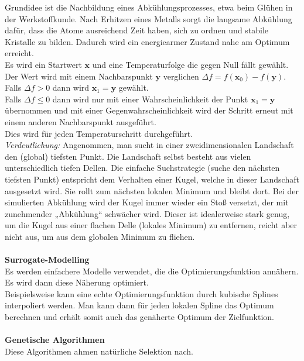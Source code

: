 			Grundidee ist die Nachbildung eines Abkühlungsprozesses, etwa beim Glühen in der Werkstoffkunde. Nach Erhitzen eines Metalls sorgt die langsame Abkühlung dafür, dass die Atome ausreichend Zeit haben, sich zu ordnen und stabile Kristalle zu bilden. Dadurch wird ein energiearmer Zustand nahe am Optimum erreicht. \\
			Es wird ein Startwert $ \bm{x} $ und eine Temperaturfolge die gegen Null fällt gewählt. Der Wert wird mit einem Nachbarspunkt $ \bm{y} $ verglichen $ \Delta f = f(\bm{x}_{0})-f(\bm{y}) $.\\
			Falls $ \Delta f > 0 $ dann wird $ \bm{x}_{1}=\bm{y} $ gewählt.\\
			Falls $ \Delta f \leq 0 $ dann wird nur mit einer Wahrscheinlichkeit der Punkt $ \bm{x}_{1}=\bm{y} $ übernommen und mit einer Gegenwahrscheinlichkeit wird der Schritt erneut mit einem anderen Nachbarspunkt ausgeführt.\\
			Dies wird für jeden Temperaturschritt durchgeführt.\\
			\textit{Verdeutlichung: } Angenommen, man sucht in einer zweidimensionalen Landschaft den (global) tiefsten Punkt. Die Landschaft selbst besteht aus vielen unterschiedlich tiefen Dellen. Die einfache Suchstrategie (suche den nächsten tiefsten Punkt) entspricht dem Verhalten einer Kugel, welche in dieser Landschaft ausgesetzt wird. Sie rollt zum nächsten lokalen Minimum und bleibt dort. Bei der simulierten Abkühlung wird der Kugel immer wieder ein Stoß versetzt, der mit zunehmender „Abkühlung“ schwächer wird. Dieser ist idealerweise stark genug, um die Kugel aus einer flachen Delle (lokales Minimum) zu entfernen, reicht aber nicht aus, um aus dem globalen Minimum zu fliehen.
			\leavevmode\\\\
			\textbf{Surrogate-Modelling}\\
			Es werden einfachere Modelle verwendet, die die Optimierungsfunktion annähern. Es wird dann diese Näherung optimiert.\\
			Beispielsweise kann eine echte Optimierungsfunktion durch kubische Splines interpoliert werden. Man kann dann für jeden lokalen Spline das Optimum berechnen und erhält somit auch das genäherte Optimum der Zielfunktion.
			\leavevmode\\\\
			\textbf{Genetische Algorithmen}\\
			Diese Algorithmen ahmen natürliche Selektion nach.  
